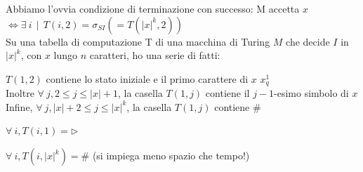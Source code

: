 \documentclass[10pt]{book}
\begin{document}
Abbiamo l'ovvia condizione di terminazione con successo: M accetta $x$ $\Leftrightarrow \exists\:i\:\:|\:\:T(i, 2) = \sigma_{SI} (= T(|x|^k, 2))$\\
Su una tabella di computazione T di una macchina di Turing $M$ che decide $I$ in $|x|^k$, con $x$ lungo $n$ caratteri, ho una serie di fatti:
\begin{list}{}{}
	\item $T(1, 2)$ contiene lo stato iniziale e il primo carattere di $x$ $x_q^1$\\
	Inoltre $\forall\:j, 2\leq j \leq |x| + 1$, la casella $T(1, j)$ contiene il $j - 1$-esimo simbolo di $x$\\
	Infine, $\forall\:j, |x| + 2 \leq j \leq |x|^k$, la casella $T(1, j)$ contiene $\#$
	\item $\forall\:i, T(i, 1) = \triangleright$
	\item $\forall\:i, T(i, |x|^k) = \#$ (si impiega meno spazio che tempo!)
\end{list}
\end{document}
